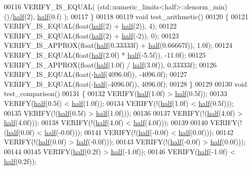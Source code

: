 \begin{DoxyCode}
00116   VERIFY\_IS\_EQUAL( (std::numeric\_limits<half>::denorm\_min)()/\hyperlink{struct_eigen_1_1half}{half}(2), \hyperlink{struct_eigen_1_1half}{half}(0.f) );
00117 \}
00118 
00119 \textcolor{keywordtype}{void} test\_arithmetic()
00120 \{
00121   VERIFY\_IS\_EQUAL(\textcolor{keywordtype}{float}(\hyperlink{struct_eigen_1_1half}{half}(2) + \hyperlink{struct_eigen_1_1half}{half}(2)), 4);
00122   VERIFY\_IS\_EQUAL(\textcolor{keywordtype}{float}(\hyperlink{struct_eigen_1_1half}{half}(2) + \hyperlink{struct_eigen_1_1half}{half}(-2)), 0);
00123   VERIFY\_IS\_APPROX(\textcolor{keywordtype}{float}(\hyperlink{struct_eigen_1_1half}{half}(0.33333f) + \hyperlink{struct_eigen_1_1half}{half}(0.66667f)), 1.0f);
00124   VERIFY\_IS\_EQUAL(\textcolor{keywordtype}{float}(\hyperlink{struct_eigen_1_1half}{half}(2.0f) * \hyperlink{struct_eigen_1_1half}{half}(-5.5f)), -11.0f);
00125   VERIFY\_IS\_APPROX(\textcolor{keywordtype}{float}(\hyperlink{struct_eigen_1_1half}{half}(1.0f) / \hyperlink{struct_eigen_1_1half}{half}(3.0f)), 0.33333f);
00126   VERIFY\_IS\_EQUAL(\textcolor{keywordtype}{float}(-\hyperlink{struct_eigen_1_1half}{half}(4096.0f)), -4096.0f);
00127   VERIFY\_IS\_EQUAL(\textcolor{keywordtype}{float}(-\hyperlink{struct_eigen_1_1half}{half}(-4096.0f)), 4096.0f);
00128 \}
00129 
00130 \textcolor{keywordtype}{void} test\_comparison()
00131 \{
00132   VERIFY(\hyperlink{struct_eigen_1_1half}{half}(1.0f) > \hyperlink{struct_eigen_1_1half}{half}(0.5f));
00133   VERIFY(\hyperlink{struct_eigen_1_1half}{half}(0.5f) < \hyperlink{struct_eigen_1_1half}{half}(1.0f));
00134   VERIFY(!(\hyperlink{struct_eigen_1_1half}{half}(1.0f) < \hyperlink{struct_eigen_1_1half}{half}(0.5f)));
00135   VERIFY(!(\hyperlink{struct_eigen_1_1half}{half}(0.5f) > \hyperlink{struct_eigen_1_1half}{half}(1.0f)));
00136 
00137   VERIFY(!(\hyperlink{struct_eigen_1_1half}{half}(4.0f) > \hyperlink{struct_eigen_1_1half}{half}(4.0f)));
00138   VERIFY(!(\hyperlink{struct_eigen_1_1half}{half}(4.0f) < \hyperlink{struct_eigen_1_1half}{half}(4.0f)));
00139 
00140   VERIFY(!(\hyperlink{struct_eigen_1_1half}{half}(0.0f) < \hyperlink{struct_eigen_1_1half}{half}(-0.0f)));
00141   VERIFY(!(\hyperlink{struct_eigen_1_1half}{half}(-0.0f) < \hyperlink{struct_eigen_1_1half}{half}(0.0f)));
00142   VERIFY(!(\hyperlink{struct_eigen_1_1half}{half}(0.0f) > \hyperlink{struct_eigen_1_1half}{half}(-0.0f)));
00143   VERIFY(!(\hyperlink{struct_eigen_1_1half}{half}(-0.0f) > \hyperlink{struct_eigen_1_1half}{half}(0.0f)));
00144 
00145   VERIFY(\hyperlink{struct_eigen_1_1half}{half}(0.2f) > \hyperlink{struct_eigen_1_1half}{half}(-1.0f));
00146   VERIFY(\hyperlink{struct_eigen_1_1half}{half}(-1.0f) < \hyperlink{struct_eigen_1_1half}{half}(0.2f));

\end{DoxyCode}
